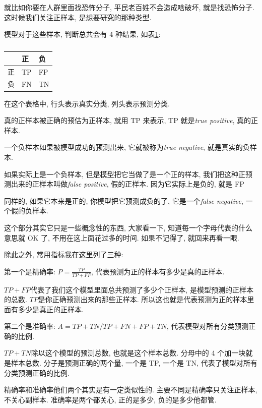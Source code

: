 就比如你要在人群里面找恐怖分子, 平民老百姓不会造成啥破坏, 就是找恐怖分子. 这时候我们关注正样本, 是想要研究的那种类型. 

模型对于这些样本, 判断总共会有 4 种结果, 如表\ref{tab:table23_1}: 

\begin{table}[ht]
  \centering
  \begin{tabular}{lll}
    \toprule
        & 正 & 负   \\
    \midrule
      正 & TP & FP \\
      负 & FN & TN \\
    \bottomrule
  \end{tabular}
  \caption{}
  \label{tab:table23_1}
\end{table}

在这个表格中, 行头表示真实分类, 列头表示预测分类. 

真的正样本被正确的预估为正样本, 就用 TP 来表示, TP 就是\textit{true positive}, 真的正样本. 

一个负样本如果被模型成功的预测出来, 它就被称为\textit{true negative}, 就是真实的负样本. 

如果实际上是一个负样本, 但是模型把它当做了是一个正的样本, 我们把这种正预测出来的正样本叫做\textit{false positive}, 假的正样本. 因为它实际上是负的, 就是 FP

同样的, 如果它本来是正的, 你模型把它预测成负的了, 它是一个\textit{false negative}, 一个假的负样本. 

这个部分其实它只是一些概念性的东西, 大家看一下, 知道每一个字母代表的什么意思就 OK 了, 不用在这上面花过多的时间. 如果不记得了, 就回来再看一眼. 

除此之外, 常用指标我在这里列了三种: 

第一个是精确率: $P = \frac{TP}{TP+FP}$, 代表预测为正的样本有多少是真的正样本. 

$TP+FP$代表了我们这个模型里面总共预测了多少个正样本, 是模型预测的正样本的总数. $TP$是你正确预测出来的那些正样本. 所以这也就是代表预测为正的样本里面有多少是真正的正样本. 

第二个是准确率: $A=TP+TN/TP+FN+FP+TN$, 代表模型对所有分类预测正确的比例. 

$TP+TN$除以这个模型的预测总数, 也就是这个样本总数. 分母中的 4 个加一块就是样本总数. 分子是预测正确的两个量, 一个是 TP, 一个是 TN, 代表了模型对所有分类预测正确的比例. 

精确率和准确率他们两个其实是有一定类似性的. 主要不同是精确率只关注正样本, 不关心副样本. 准确率是两个都关心, 正的是多少, 负的是多少他都管. 

